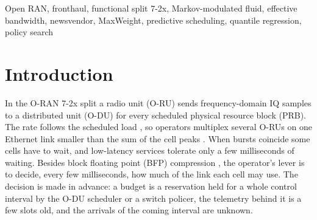 \documentclass[journal]{IEEEtran}
\begin{document}
\begin{abstract}
reservation and back-pressure. We state this regime map, report the negative results, and release the code.
\end{abstract}

\begin{IEEEkeywords}
Open RAN, fronthaul, functional split 7-2x, Markov-modulated fluid, effective bandwidth, newsvendor, MaxWeight, predictive scheduling, quantile regression, policy search
\end{IEEEkeywords}

\section{Introduction}
\label{sec:intro}
In the O-RAN 7-2x split \cite{oran_cus,polese2023} a radio unit (O-RU) sends frequency-domain IQ samples to a distributed unit (O-DU) for every scheduled physical resource block (PRB). The rate follows the scheduled load \cite{larsen2019}, so operators multiplex several O-RUs on one Ethernet link smaller than the sum of the cell peaks \cite{perez2018,wang2017}. When bursts coincide some cells have to wait, and low-latency services tolerate only a few milliseconds of waiting. Besides block floating point (BFP) compression \cite{oran_cus,lagen2022}, the operator's lever is to decide, every few milliseconds, how much of the link each cell may use. The decision is made in advance: a budget is a reservation held for a whole control interval by the O-DU scheduler or a switch policer, the telemetry behind it is a few slots old, and the arrivals of the coming interval are unknown.
\end{document}
